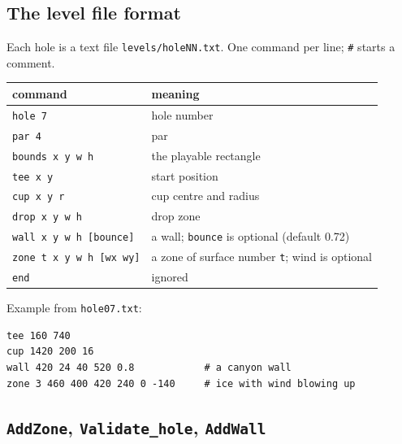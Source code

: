 \documentclass[11pt,a4paper]{article}
\newcommand{\code}[3]{}
\begin{document}
\subsection{The level file format}

Each hole is a text file \texttt{levels/holeNN.txt}. One command per line; \texttt{\#} starts a comment.

\begin{center}
\begin{tabular}{@{}ll@{}}
\toprule
command & meaning \\
\midrule
\texttt{hole 7}                      & hole number \\
\texttt{par 4}                       & par \\
\texttt{bounds x y w h}              & the playable rectangle \\
\texttt{tee x y}                     & start position \\
\texttt{cup x y r}                   & cup centre and radius \\
\texttt{drop x y w h}                & drop zone \\
\texttt{wall x y w h [bounce]}       & a wall; \texttt{bounce} is optional (default 0.72) \\
\texttt{zone t x y w h [wx wy]}      & a zone of surface number \texttt{t}; wind is optional \\
\texttt{end}                         & ignored \\
\bottomrule
\end{tabular}
\end{center}

Example from \texttt{hole07.txt}:
\begin{lstlisting}[numbers=none]
tee 160 740
cup 1420 200 16
wall 420 24 40 520 0.8            # a canyon wall
zone 3 460 400 420 240 0 -140     # ice with wind blowing up
\end{lstlisting}

\subsection{\texttt{AddZone}, \texttt{Validate\_hole}, \texttt{AddWall}}

\code{level.c}{1}{42}
\end{document}
